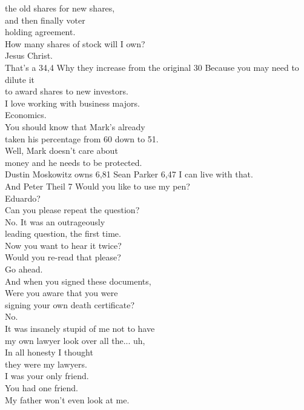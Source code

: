 \documentclass{article}
\begin{document}
\begin{multicols}{3}
the old shares for new shares,\\
and then finally voter\\
holding agreement.\\
How many shares of stock will I own?\\
Jesus Christ.\\
That's a 34,4%
Why they increase from the original 30%
Because you may need to dilute it\\
to award shares to new investors.\\
I love working with business majors.\\
Economics.\\
You should know that Mark's already\\
taken his percentage from 60 down to 51.\\
Well, Mark doesn't care about\\
money and he needs to be protected.\\
Dustin Moskowitz owns 6,81%
Sean Parker 6,47%
I can live with that.\\
And Peter Theil 7%
Would you like to use my pen?\\
Eduardo?\\
Can you please repeat the question?\\
No. It was an outrageously\\
leading question, the first time.\\
Now you want to hear it twice?\\
Would you re-read that please?\\
Go ahead.\\
And when you signed these documents,\\
Were you aware that you were\\
signing your own death certificate?\\
No.\\
It was insanely stupid of me not to have\\
my own lawyer look over all the... uh,\\
In all honesty I thought\\
they were my lawyers.\\
I was your only friend.\\
You had one friend.\\
My father won't even look at me.\\

\end{multicols}
\end{document}
